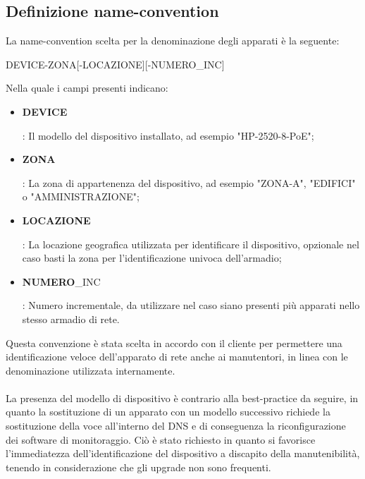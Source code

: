 \documentclass[Realizzazione.tex]{subfiles}
\begin{document}
\subsection{Definizione name-convention}
La name-convention scelta per la denominazione degli apparati è la seguente:\\
{ \centering
	\begin{ttfamily}
		\large DEVICE-ZONA[-LOCAZIONE][-NUMERO\_INC]\\
	\end{ttfamily}
}
\medskip
Nella quale i campi presenti indicano: 
\begin{itemize}
	\item  \begin{ttfamily}\textbf{DEVICE}\end{ttfamily}: Il modello del dispositivo installato, ad esempio "HP-2520-8-PoE";
	\item  \begin{ttfamily}\textbf{ZONA}\end{ttfamily}: La zona di appartenenza del dispositivo, ad esempio "ZONA-A", "EDIFICI" o "AMMINISTRAZIONE";
	\item  \begin{ttfamily}\textbf{LOCAZIONE}\end{ttfamily}: La locazione geografica utilizzata per identificare il dispositivo, opzionale nel caso basti la zona per l'identificazione univoca dell'armadio;
	\item  \begin{ttfamily}\textbf{NUMERO}\_INC\end{ttfamily}: Numero incrementale, da utilizzare nel caso siano presenti più apparati nello stesso armadio di rete.
\end{itemize}

Questa convenzione è stata scelta in accordo con il cliente per permettere una identificazione veloce dell'apparato di rete anche ai manutentori, in linea con le denominazione utilizzata internamente. \\\\
La presenza del modello di dispositivo è contrario alla best-practice da seguire, in quanto la sostituzione di un apparato con un modello successivo richiede la sostituzione della voce all'interno del DNS e di conseguenza la riconfigurazione dei software di monitoraggio. Ciò è stato richiesto in quanto si favorisce l'immediatezza dell'identificazione del dispositivo a discapito della manutenibilità, tenendo in considerazione che gli upgrade non sono frequenti. \\
\end{document}

